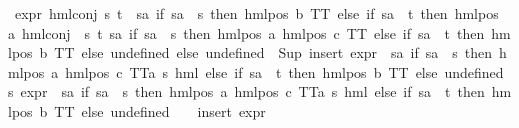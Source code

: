 \begin{isabellebody}
\ {\isachardoublequoteopen}expr{\isacharunderscore}{\kern0pt}{}\ {\isacharparenleft}{\kern0pt}hml{\isacharunderscore}{\kern0pt}conj\ {\isacharbraceleft}{\kern0pt}s{\isacharcomma}{\kern0pt}\ t{\isacharbraceright}{\kern0pt}\ {\isacharbraceleft}{\kern0pt}{\isacharbraceright}{\kern0pt}\ {\isacharparenleft}{\kern0pt}{\isasymlambda}sa{\isachardot}{\kern0pt}\ if\ sa\ {\isacharequal}{\kern0pt}\ s\ then\ hml{\isacharunderscore}{\kern0pt}pos\ b\ TT\ else\ if\ sa\ {\isacharequal}{\kern0pt}\ t\ then\ hml{\isacharunderscore}{\kern0pt}pos\ a\ {\isacharparenleft}{\kern0pt}hml{\isacharunderscore}{\kern0pt}conj\ {\isacharbraceleft}{\kern0pt}{\isacharbraceright}{\kern0pt}\ {\isacharbraceleft}{\kern0pt}s{\isacharcomma}{\kern0pt}\ t{\isacharbraceright}{\kern0pt}\ {\isacharparenleft}{\kern0pt}{\isasymlambda}sa{\isachardot}{\kern0pt}\ if\ sa\ {\isacharequal}{\kern0pt}\ s\ then\ hml{\isacharunderscore}{\kern0pt}pos\ a\ {\isacharparenleft}{\kern0pt}hml{\isacharunderscore}{\kern0pt}pos\ c\ TT{\isacharparenright}{\kern0pt}\ else\ if\ sa\ {\isacharequal}{\kern0pt}\ t\ then\ hml{\isacharunderscore}{\kern0pt}pos\ b\ TT\ else\ undefined{\isacharparenright}{\kern0pt}{\isacharparenright}{\kern0pt}\ else\ undefined{\isacharparenright}{\kern0pt}{\isacharparenright}{\kern0pt}\ {\isacharequal}{\kern0pt}\ Sup\ {\isacharparenleft}{\kern0pt}insert\ {\isacharparenleft}{\kern0pt}{\isacharparenleft}{\kern0pt}expr{\isacharunderscore}{\kern0pt}{}\ {\isasymcirc}\ {\isacharparenleft}{\kern0pt}{\isasymlambda}sa{\isachardot}{\kern0pt}\ if\ sa\ {\isacharequal}{\kern0pt}\ s\ then\ hml{\isacharunderscore}{\kern0pt}pos\ a\ {\isacharparenleft}{\kern0pt}hml{\isacharunderscore}{\kern0pt}pos\ c\ {\isacharparenleft}{\kern0pt}TT{\isacharcolon}{\kern0pt}{\isacharcolon}{\kern0pt}{\isacharparenleft}{\kern0pt}{\isacharprime}{\kern0pt}a{\isacharcomma}{\kern0pt}\ {\isacharprime}{\kern0pt}s{\isacharparenright}{\kern0pt}\ hml{\isacharparenright}{\kern0pt}{\isacharparenright}{\kern0pt}\ else\ if\ sa\ {\isacharequal}{\kern0pt}\ t\ then\ hml{\isacharunderscore}{\kern0pt}pos\ b\ TT\ else\ undefined{\isacharparenright}{\kern0pt}{\isacharparenright}{\kern0pt}\ s{\isacharparenright}{\kern0pt}\ {\isacharparenleft}{\kern0pt}{\isacharparenleft}{\kern0pt}expr{\isacharunderscore}{\kern0pt}{}\ {\isasymcirc}\ {\isacharparenleft}{\kern0pt}{\isasymlambda}sa{\isachardot}{\kern0pt}\ if\ sa\ {\isacharequal}{\kern0pt}\ s\ then\ hml{\isacharunderscore}{\kern0pt}pos\ a\ {\isacharparenleft}{\kern0pt}hml{\isacharunderscore}{\kern0pt}pos\ c\ {\isacharparenleft}{\kern0pt}TT{\isacharcolon}{\kern0pt}{\isacharcolon}{\kern0pt}{\isacharparenleft}{\kern0pt}{\isacharprime}{\kern0pt}a{\isacharcomma}{\kern0pt}\ {\isacharprime}{\kern0pt}s{\isacharparenright}{\kern0pt}\ hml{\isacharparenright}{\kern0pt}{\isacharparenright}{\kern0pt}\ else\ if\ sa\ {\isacharequal}{\kern0pt}\ t\ then\ hml{\isacharunderscore}{\kern0pt}pos\ b\ TT\ else\ undefined{\isacharparenright}{\kern0pt}{\isacharparenright}{\kern0pt}\ {\isacharbackquote}{\kern0pt}\ {\isacharbraceleft}{\kern0pt}{\isacharbraceright}{\kern0pt}{\isacharparenright}{\kern0pt}\ {\isasymunion}\ insert\ {\isacharparenleft}{\kern0pt}{\isacharparenleft}{\kern0pt}expr{\isacharunderscore}{\kern0pt}{}\ {\isasymcirc}\ 
\end{isabellebody}
